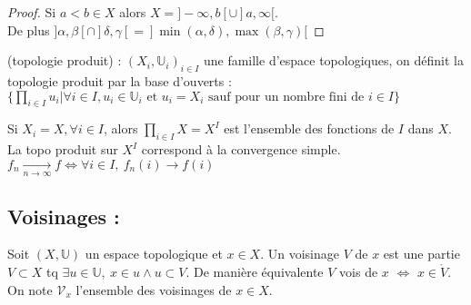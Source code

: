 \begin{proof}
    Si $a<b\in X$ alors $X=]-\infty, b[\cup]a, \infty [$. \\
    De plus $] \alpha, \beta[\cap ] \delta, \gamma[ = ]\min(\alpha, \delta) , \max(\beta, \gamma)[$
\end{proof}
\begin{ex}
     (topologie produit) : $(X_i,\mathbb{U}_i)_{i\in I}$ une famille d'espace topologiques, on définit la topologie produit par la base d'ouverts : \\
     $\{\prod\limits_{i\in I}u_i|\forall i\in I, u_i\in \mathbb{U}_i \text{ et }u_i=X_i \text{ sauf pour un nombre fini de } i\in I \}$
\end{ex}
\begin{ex}
    Si $X_i=X, \forall i\in I$, alors $\prod\limits_{i\in I}X=X^I$ est l'ensemble des fonctions de $I$ dans $X$. La topo produit sur $X^I$ correspond à la convergence simple. $f_n\underset{n\to \infty }{\longrightarrow} f\Leftrightarrow \forall i\in I,\ f_n(i)\to f(i)$
\end{ex}

\subsection{ Voisinages :}
\begin{definition}[voisinage]
    Soit $(X,\mathbb{U})$ un espace topologique et $x\in X$. Un voisinage $V$ de $x$ est une partie $V\subset X$ tq $\exists u\in \mathbb{U},\ x\in u \wedge u\subset V$. De manière équivalente $V$ vois de $x$ $\Leftrightarrow $ $x\in \mathring{V}$.\\
     On note $\mathcal{V}_x$ l'ensemble des voisinages de $x\in X$.
\end{definition}

